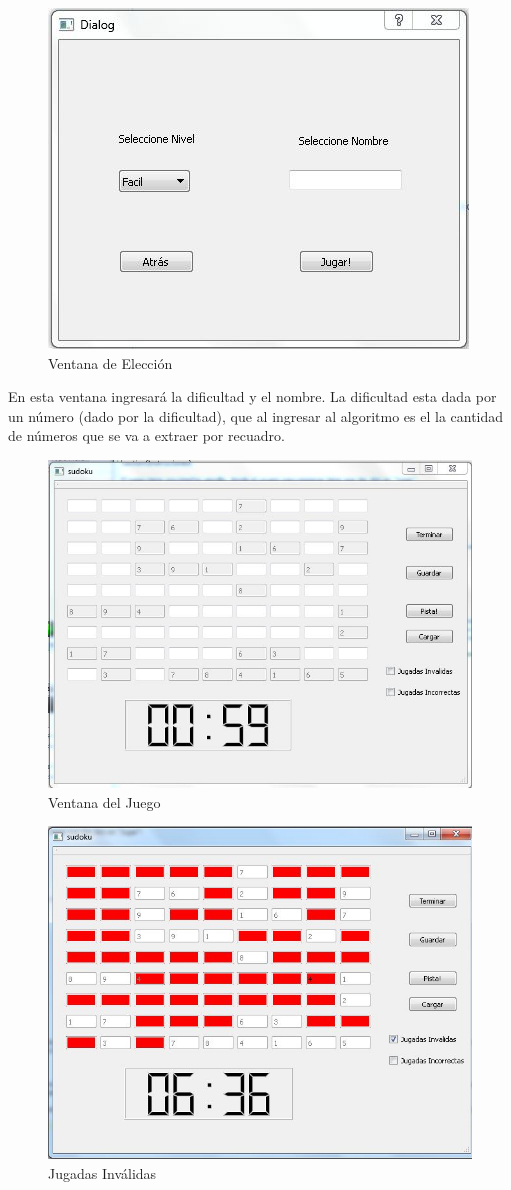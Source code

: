 \newpage
\begin{figure}[htbp]
\begin{center}
\includegraphics[width=.60\textwidth]{./imagenes/2.jpg}
\caption{Ventana de Elección}
\label{Ventana de Elección}
\end{center}
\end{figure}
En esta ventana ingresará la dificultad y el nombre. La dificultad esta dada por un número (dado por la dificultad), que al ingresar al algoritmo es el la cantidad de números que se va a extraer por recuadro.

\newpage
\begin{figure}[htbp]
\begin{center}
\includegraphics[width=.60\textwidth]{./imagenes/3.jpg}
\caption{Ventana del Juego}
\label{Ventana del Juego}
\end{center}
\end{figure}

\begin{figure}[htbp]
\begin{center}
\includegraphics[width=.60\textwidth]{./imagenes/4.jpg}
\caption{Jugadas Inválidas}
\label{Jugadas Inválidas}
\end{center}
\end{figure}


